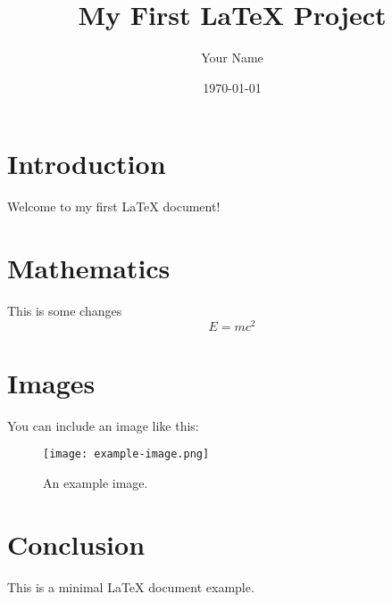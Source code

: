 \documentclass[a4paper,12pt]{article}
\title{My First LaTeX Project}
\author{Your Name}
\date{\today} %
\begin{document}
	
	\maketitle
	
	\tableofcontents %
	
	\section{Introduction}
	Welcome to my first LaTeX document!
	
	\section{Mathematics}
    This is some changes	
	\[
	E = mc^2
	\]
	
	\section{Images}
	You can include an image like this:
	
	\begin{figure}[h!]
		\centering
		\texttt{[image: example-image.png]} %
		\caption{An example image.}
		\label{fig:example}
	\end{figure}
	
	\section{Conclusion}
	This is a minimal LaTeX document example.
	
\end{document}
